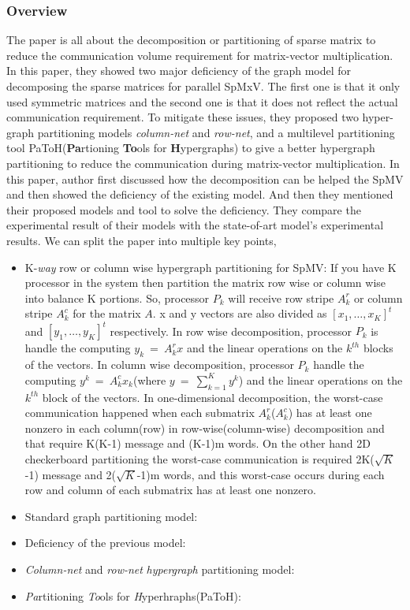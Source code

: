 \documentclass[conference, onecolumn]{IEEEtran}
\begin{document}
\subsubsection{Overview}
The paper is all about the decomposition or partitioning of sparse matrix to reduce the communication volume requirement for 
matrix-vector multiplication. In this paper, they showed two major deficiency of the graph model for decomposing the sparse matrices 
for parallel SpMxV. The first one is that it only used symmetric matrices and the second one is that it does not reflect the 
actual communication requirement. To mitigate these issues, they proposed two hyper-graph partitioning models \textit{column-net} and \textit{row-net}, 
and a multilevel partitioning tool PaToH(\textbf{Pa}rtioning \textbf{To}ols for \textbf{H}ypergraphs) to give a better hypergraph 
partitioning to reduce the communication during matrix-vector multiplication. In this paper, author first discussed how the decomposition 
can be helped the SpMV and then showed the deficiency of the existing model. And then they mentioned their proposed models and tool to solve 
the deficiency. They compare the experimental result of their models with the state-of-art model's experimental results. We can 
split the paper into multiple key points,
\begin{itemize}
\item K-\textit{way} row or column wise hypergraph partitioning for SpMV: If you have K processor in the system then partition the 
matrix row wise or column wise into balance K portions. So, processor $P_k$ will receive row stripe $A_k^r$ or column stripe $A_k^c$ 
for the matrix $A$. x and y vectors are also divided as $[x_1,\dots,x_K]^t$ and $[y_1,\dots,y_K]^t$ respectively. In row wise decomposition, 
processor $P_k$ is handle the computing $y_k\ =\ A_k^rx$ and the linear operations on the $k^{th}$ blocks of the vectors. In column wise decomposition, 
processor $P_k$ handle the computing $y^k\ =\ A_k^cx_k$(where $y\ =\ \sum_{k=1}^Ky^k$) and the linear operations on the $k^{th}$ block of the vectors. 
In one-dimensional decomposition, the worst-case communication happened when each submatrix $A_k^r$($A_k^c$) has at least one nonzero 
in each column(row) in row-wise(column-wise) decomposition and that require K(K-1) message and (K-1)m words. On the other hand 2D checkerboard 
partitioning the worst-case communication is required 2K($\sqrt{K}$-1) message and 2($\sqrt{K}$-1)m words, and this worst-case occurs during 
each row and column of each submatrix has at least one nonzero. 
\item Standard graph partitioning model:
\item Deficiency of the previous model:
\item \textit{Column-net} and \textit{row-net} \textit{hypergraph} partitioning model:
\item \textit{Pa}rtitioning \textit{To}ols for \textit{H}yperhraphs(PaToH):
\end{itemize}
\end{document}
